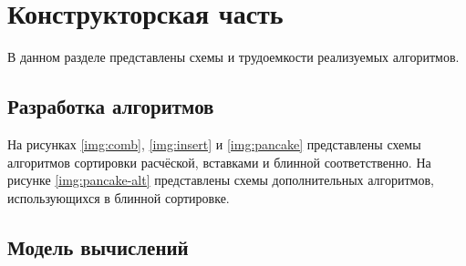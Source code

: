 \chapter{Конструкторская часть}

В данном разделе представлены схемы и трудоемкости реализуемых алгоритмов.

\section{Разработка алгоритмов}

На рисунках \ref{img:comb}, \ref{img:insert} и \ref{img:pancake} представлены схемы алгоритмов сортировки расчёской, вставками и блинной соответственно.
На рисунке \ref{img:pancake-alt} представлены схемы дополнительных алгоритмов, использующихся в блинной сортировке.

\clearpage
{}
\clearpage

\section{Модель вычислений}

